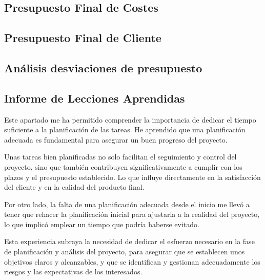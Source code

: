 \subsection{Presupuesto Final de Costes}


\subsection{Presupuesto Final de Cliente}


\subsection{Análisis desviaciones de presupuesto}




\subsection{Informe de Lecciones Aprendidas}
Este apartado me ha permitido comprender la importancia de dedicar el tiempo suficiente a la planificación de las tareas. 
He aprendido que una planificación adecuada es fundamental para asegurar un buen progreso del proyecto.

Unas tareas bien planificadas no solo facilitan el seguimiento y control del proyecto, sino que también contribuyen significativamente a cumplir con los plazos 
y el presupuesto establecido. Lo que influye directamente en la satisfacción del cliente y en la calidad del producto final.

Por otro lado, la falta de una planificación adecuada desde el inicio me llevó a tener que rehacer la planificación inicial para ajustarla a la realidad del proyecto, 
lo que implicó emplear un tiempo que podría haberse evitado.

Esta experiencia subraya la necesidad de dedicar el esfuerzo necesario en la fase de planificación y análisis del proyecto,
para asegurar que se establecen unos objetivos claros y alcanzables, y que se identifican y gestionan adecuadamente los riesgos y las expectativas de los interesados.
